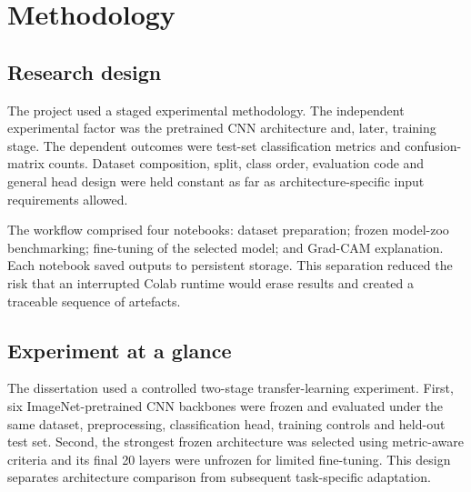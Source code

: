 \chapter{Methodology}
\label{chap:methodology}

\section{Research design}
The project used a staged experimental methodology. The independent experimental factor was the pretrained CNN architecture and, later, training stage. The dependent outcomes were test-set classification metrics and confusion-matrix counts. Dataset composition, split, class order, evaluation code and general head design were held constant as far as architecture-specific input requirements allowed.

The workflow comprised four notebooks: dataset preparation; frozen model-zoo benchmarking; fine-tuning of the selected model; and Grad-CAM explanation. Each notebook saved outputs to persistent storage. This separation reduced the risk that an interrupted Colab runtime would erase results and created a traceable sequence of artefacts.

\section{Experiment at a glance}
The dissertation used a controlled two-stage transfer-learning experiment. First, six ImageNet-pretrained CNN backbones were frozen and evaluated under the same dataset, preprocessing, classification head, training controls and held-out test set. Second, the strongest frozen architecture was selected using metric-aware criteria and its final 20 layers were unfrozen for limited fine-tuning. This design separates architecture comparison from subsequent task-specific adaptation.

